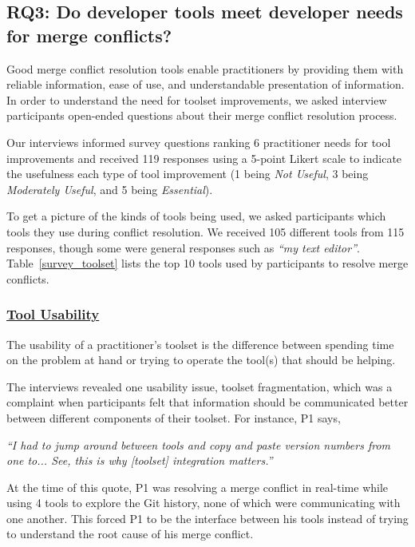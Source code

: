 \subsection{\textbf{RQ3:} Do developer tools meet developer needs for merge conflicts?}\label{RQ3}
Good merge conflict resolution tools enable practitioners by providing them with reliable information, ease of use, and understandable presentation of information. In order to understand the need for toolset improvements, we asked interview participants open-ended questions about their merge conflict resolution process.

Our interviews informed survey questions ranking 6 practitioner needs for tool improvements and received 119 responses using a 5-point Likert scale to indicate the usefulness each type of tool improvement (1 being \textit{Not Useful}, 3 being \textit{Moderately Useful}, and 5 being \textit{Essential}).

To get a picture of the kinds of tools being used, we asked participants which tools they use during conflict resolution. We received 105 different tools from 115 responses, though some were general responses such as \textit{``my text editor''}. Table~\ref{survey_toolset} lists the top 10 tools used by participants to resolve merge conflicts.


\subsubsection{\underline{Tool Usability}} The usability of a practitioner's toolset is the difference between spending time on the problem at hand or trying to operate the tool(s) that should be helping. 

The interviews revealed one usability issue, toolset fragmentation, which was a complaint when participants felt that information should be communicated better between different components of their toolset. For instance, P1 says, 

\begin{displayquote}
\textit{``I had to jump around between tools and copy and paste version numbers from one to... See, this is why [toolset] integration matters.''}
\end{displayquote}

At the time of this quote, P1 was resolving a merge conflict in real-time while using 4 tools to explore the Git history, none of which were communicating with one another. This forced P1 to be the interface between his tools instead of trying to understand the root cause of his merge conflict.


